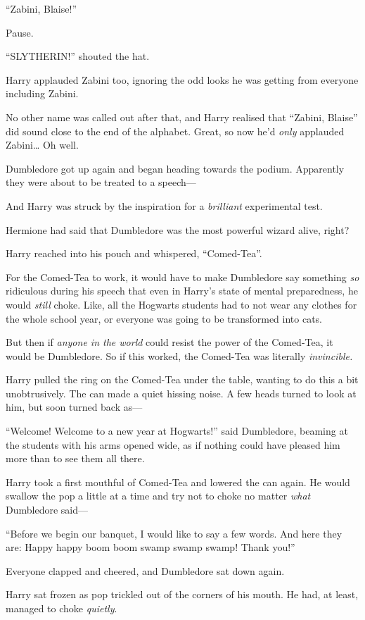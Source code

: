 ``Zabini, Blaise!''

Pause.

``SLYTHERIN!'' shouted the hat.

Harry applauded Zabini too, ignoring the odd looks he was getting from
everyone including Zabini.

No other name was called out after that, and Harry realised that
``Zabini, Blaise'' did sound close to the end of the alphabet. Great, so
now he'd \emph{only} applauded Zabini\ldots{} Oh well.

Dumbledore got up again and began heading towards the podium. Apparently
they were about to be treated to a speech---

And Harry was struck by the inspiration for a \emph{brilliant}
experimental test.

Hermione had said that Dumbledore was the most powerful wizard alive,
right?

Harry reached into his pouch and whispered, ``Comed-Tea''.

For the Comed-Tea to work, it would have to make Dumbledore say
something \emph{so} ridiculous during his speech that even in Harry's
state of mental preparedness, he would \emph{still} choke. Like, all the
Hogwarts students had to not wear any clothes for the whole school year,
or everyone was going to be transformed into cats.

But then if \emph{anyone in the world} could resist the power of the
Comed-Tea, it would be Dumbledore. So if this worked, the Comed-Tea was
literally \emph{invincible.}

Harry pulled the ring on the Comed-Tea under the table, wanting to do
this a bit unobtrusively. The can made a quiet hissing noise. A few
heads turned to look at him, but soon turned back as---

``Welcome! Welcome to a new year at Hogwarts!'' said Dumbledore, beaming
at the students with his arms opened wide, as if nothing could have
pleased him more than to see them all there.

Harry took a first mouthful of Comed-Tea and lowered the can again. He
would swallow the pop a little at a time and try not to choke no matter
\emph{what} Dumbledore said---

``Before we begin our banquet, I would like to say a few words. And here
they are: Happy happy boom boom swamp swamp swamp! Thank you!''

Everyone clapped and cheered, and Dumbledore sat down again.

Harry sat frozen as pop trickled out of the corners of his mouth. He
had, at least, managed to choke \emph{quietly}.

